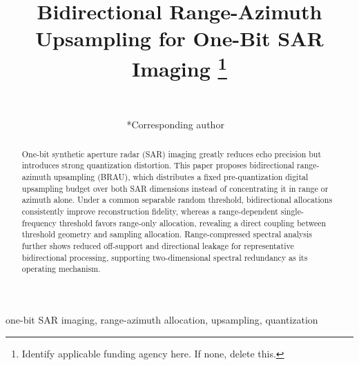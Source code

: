 \documentclass[conference]{IEEEtran}
\begin{document}
\title{Bidirectional Range-Azimuth Upsampling for One-Bit SAR Imaging
\thanks{Identify applicable funding agency here. If none, delete this.}
}

\author{
~\\
\and
{}
*Corresponding author
~\\
\and
{}
}

\maketitle

\begin{abstract}
One-bit synthetic aperture radar (SAR) imaging greatly reduces echo precision but introduces strong quantization distortion. This paper proposes bidirectional range-azimuth upsampling (BRAU), which distributes a fixed pre-quantization digital upsampling budget over both SAR dimensions instead of concentrating it in range or azimuth alone. Under a common separable random threshold, bidirectional allocations consistently improve reconstruction fidelity, whereas a range-dependent single-frequency threshold favors range-only allocation, revealing a direct coupling between threshold geometry and sampling allocation. Range-compressed spectral analysis further shows reduced off-support and directional leakage for representative bidirectional processing, supporting two-dimensional spectral redundancy as its operating mechanism.
\end{abstract}

\begin{IEEEkeywords}
one-bit SAR imaging, range-azimuth allocation, upsampling, quantization
\end{IEEEkeywords}
\end{document}
